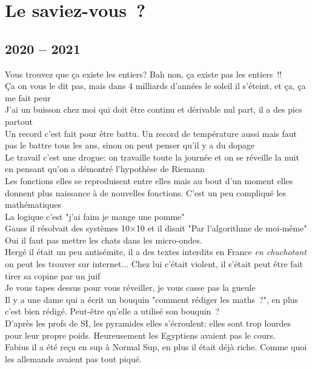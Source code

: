 \documentclass[french, a4paper, openany]{book}
\begin{document}
\section*{Le saviez-vous~?}

	\subsection*{2020 -- 2021}

	\noindent \og Vous trouvez que ça existe les entiers? Bah non, ça existe pas les entiers~!! \fg \\
	\og Ça on vous le dit pas, mais dans 4 milliards d'années le soleil il s'éteint, et ça, ça me fait peur \fg \\
	\og J'ai un buisson chez moi qui doit être continu et dérivable nul part, il a des pics partout \fg \\
	\og Un record c'est fait pour être battu. Un record de température aussi mais faut pas le battre tous les ans, sinon on peut penser qu'il y a du dopage \fg \\
	\og Le travail c'est une drogue: on travaille toute la journée et on se réveille la nuit en pensant qu'on a démontré l'hypothèse de Riemann \fg \\
	\og Les fonctions elles se reproduisent entre elles mais au bout d'un moment elles donnent plus naissance à de nouvelles fonctions. C'est un peu compliqué les mathématiques \fg \\
	\og La logique c'est "j'ai faim je mange une pomme" \fg \\
	\og Gauss il résolvait des systèmes 10×10 et il disait "Par l'algorithme de moi-même" \fg \\
	\og Oui il faut pas mettre les chats dans les micro-ondes. \fg \\
	\og Hergé il était un peu antisémite, il a des textes interdits en France \emph{en chuchotant} on peut les trouver sur internet... Chez lui c'était violent, il s'était peut être fait tirer sa copine par un juif \fg \\
	\og Je vous tapes dessus pour vous réveiller, je vous casse pas la gueule \fg \\
	\og Il y a une dame qui a écrit un bouquin "comment rédiger les maths~?", en plus c'est bien rédigé. Peut-être qu'elle a utilisé son bouquin~? \fg \\
	\og D'après les profs de SI, les pyramides elles s'écroulent: elles sont trop lourdes pour leur propre poids. Heureusement les Egyptiens avaient pas le cours. \fg \\
	\og Fabius il a été reçu en sup à Normal Sup, en plus il était déjà riche. Comme quoi les allemands avaient pas tout piqué. \fg \\
	
\end{document}
